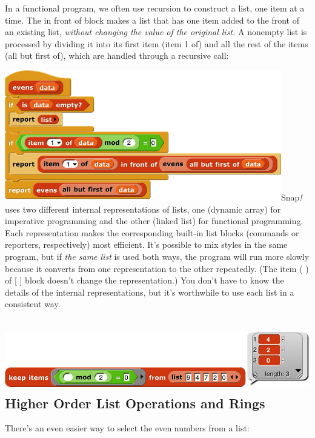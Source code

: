 In a functional program, we often use recursion to construct a list, one
item at a time. The in front of block makes a list that has one item
added to the front of an existing list, \emph{without changing the value
of the original list.} A nonempty list is processed by dividing it into
its first item (item 1 of) and all the rest of the items (all but first
of), which are handled through a recursive call:

\includegraphics[width=4.75in,height=2.24097in]{media/image555.png}Snap\emph{!}
uses two different internal representations of lists, one (dynamic
array) for imperative programming and the other (linked list) for
functional programming. Each representation makes the corresponding
built-in list blocks (commands or reporters, respectively) most
efficient. It's possible to mix styles in the same program, but if
\emph{the same list} is used both ways, the program will run more slowly
because it converts from one representation to the other repeatedly.
(The item ( ) of {[} {]} block doesn't change the representation.) You
don't have to know the details of the internal representations, but it's
worthwhile to use each list in a consistent way.

\subsection[Higher Order List Operations and
Rings]{\texorpdfstring{\protect\includegraphics[width=5.86458in,height=1.07153in]{media/image556.png}Higher
Order List Operations and
Rings}{Higher Order List Operations and Rings}}\label{higher-order-list-operations-and-rings}

There's an even easier way to select the even numbers from a list:

